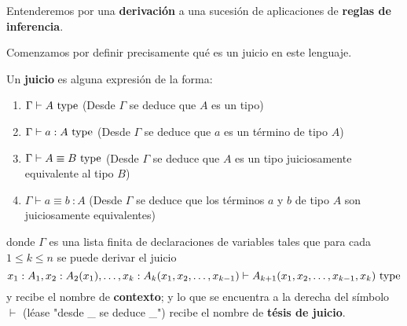 \documentclass{article}
\begin{document}
        Entenderemos por una \textbf{derivación} a una sucesión de aplicaciones de \textbf{reglas de inferencia}.

        Comenzamos por definir precisamente qué es un juicio en este lenguaje.

        \begin{definition}
            Un \textbf{juicio} es alguna expresión de la forma:
            \begin{enumerate}
                \item $\Gamma \vdash A\ \mathrm{type}$ (Desde $\Gamma$ se deduce que $A$ es un tipo)
                \item $\Gamma \vdash a : A\ \mathrm{type}$ (Desde $\Gamma$ se deduce que $a$ es un término de tipo $A$)
                \item $\Gamma \vdash A \equiv B\ \type$ (Desde $\Gamma$ se deduce que $A$ es un tipo juiciosamente equivalente al tipo $B$)
                \item $\Gamma \vdash a \equiv b\ : A$ (Desde $\Gamma$ se deduce que los términos $a$ y $b$ de tipo $A$ son juiciosamente equivalentes)
            \end{enumerate}

            donde $\Gamma$ es una lista finita de declaraciones de variables tales que para cada $1 \leq k \leq n$
            se puede derivar el juicio
            $$
                x_1 : A_1, x_2 : A_2(x_1), \dots, x_k : A_k(x_1, x_2, \dots, x_{k-1}) \vdash A_{k+1}(x_1, x_2, \dots, x_{k-1}, x_k)\ \mathrm{type}
            $$
            y recibe el nombre de \textbf{contexto}; y lo que se encuentra a la derecha del símbolo $\vdash$ 
            (léase "desde \_ se deduce \_") recibe el nombre de \textbf{tésis de juicio}.
        \end{definition}
\end{document}
